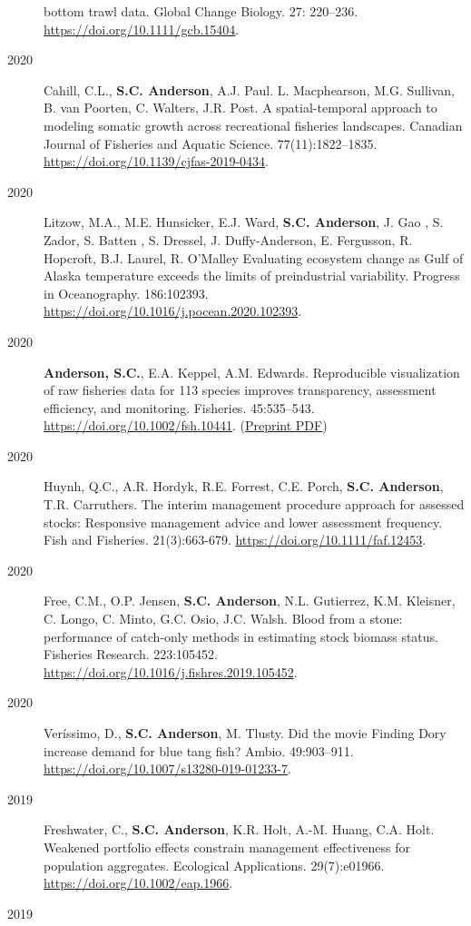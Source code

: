 \begin{description}
bottom trawl data. Global Change Biology. 27: 220--236.
\url{https://doi.org/10.1111/gcb.15404}.
\item[2020]
Cahill, C.L., \textbf{S.C. Anderson}, A.J. Paul. L. Macphearson, M.G.
Sullivan, B. van Poorten, C. Walters, J.R. Post. A spatial-temporal
approach to modeling somatic growth across recreational fisheries
landscapes. Canadian Journal of Fisheries and Aquatic Science.
77(11):1822--1835. \url{https://doi.org/10.1139/cjfas-2019-0434}.
\item[2020]
Litzow, M.A., M.E. Hunsicker, E.J. Ward, \textbf{S.C. Anderson}, J. Gao
, S. Zador, S. Batten , S. Dressel, J. Duffy-Anderson, E. Fergusson, R.
Hopcroft, B.J. Laurel, R. O'Malley Evaluating ecosystem change as Gulf
of Alaska temperature exceeds the limits of preindustrial variability.
Progress in Oceanography. 186:102393.
\url{https://doi.org/10.1016/j.pocean.2020.102393}.
\item[2020]
\textbf{Anderson, S.C.}, E.A. Keppel, A.M. Edwards. Reproducible
visualization of raw fisheries data for 113 species improves
transparency, assessment efficiency, and monitoring. Fisheries.
45:535--543. \url{https://doi.org/10.1002/fsh.10441}.
(\href{https://www.dropbox.com/s/4mmnomvmpg0dbky/Anderson_etal_2020_reproducible_visualization_preprint.pdf?dl=1}{Preprint
PDF})
\item[2020]
Huynh, Q.C., A.R. Hordyk, R.E. Forrest, C.E. Porch, \textbf{S.C.
Anderson}, T.R. Carruthers. The interim management procedure approach
for assessed stocks: Responsive management advice and lower assessment
frequency. Fish and Fisheries. 21(3):663-679.
\url{https://doi.org/10.1111/faf.12453}.
\item[2020]
Free, C.M., O.P. Jensen, \textbf{S.C. Anderson}, N.L. Gutierrez, K.M.
Kleisner, C. Longo, C. Minto, G.C. Osio, J.C. Walsh. Blood from a stone:
performance of catch-only methods in estimating stock biomass status.
Fisheries Research. 223:105452.
\url{https://doi.org/10.1016/j.fishres.2019.105452}.
\item[2020]
Veríssimo, D., \textbf{S.C. Anderson}, M. Tlusty. Did the movie Finding
Dory increase demand for blue tang fish? Ambio. 49:903--911.
\url{https://doi.org/10.1007/s13280-019-01233-7}.
\item[2019]
Freshwater, C., \textbf{S.C. Anderson}, K.R. Holt, A.-M. Huang, C.A.
Holt. Weakened portfolio effects constrain management effectiveness for
population aggregates. Ecological Applications. 29(7):e01966.
\url{https://doi.org/10.1002/eap.1966}.
\item[2019]

\end{description}
